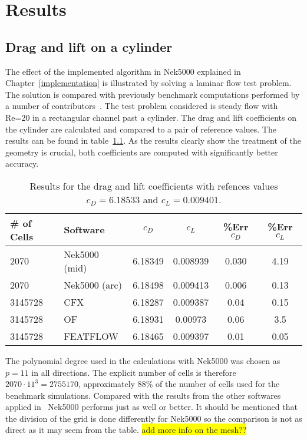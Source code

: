 
\chapter{Results} %

\label{results} %



\section{Drag and lift on a cylinder}
The effect of the implemented algorithm in Nek5000 explained in Chapter~\ref{implementation} is
illustrated by solving a laminar flow test problem. 
The solution is compared with previously benchmark computations performed by a number of 
contributors~\cite{benchmark}. The test problem considered is steady flow with Re=20 in 
a rectangular channel past a cylinder. The drag and lift coefficients on the cylinder 
are calculated and compared to a pair of reference values. The results can be found in 
table~\ref{tab:testcase}. As the results clearly show the treatment of the geometry is 
crucial, both coefficients are computed with significantly better accuracy. 
%
\begin{table}
\centering
\begin{tabular}{l l c c c c}
		\toprule
		\# of Cells & Software & $c_D$ & $c_L$ & \%\textbf{Err} $c_D$ &\%\textbf{Err} $c_L$ \\ \midrule 
		2070 & Nek5000 (mid) & 6.18349 & 0.008939 & 0.030 & 4.19 \\ 
		2070 & Nek5000 (arc) & 6.18498 & 0.009413 & 0.006 & 0.13 \\
		3145728 & CFX 		 & 6.18287 & 0.009387 & 0.04 &0.15 \\
		3145728 & OF	     & 6.18931 & 0.00973 & 0.06 &3.5 \\
		3145728 & FEATFLOW   & 6.18465 & 0.009397 & 0.01 &0.05 \\
		\bottomrule	
	\end{tabular}
	\caption{Results for the drag and lift coefficients with refences values 
	$c_D = 6.18533$ and $c_L = 0.009401$.}
\label{tab:testcase}
\end{table}
%
The polynomial degree used in the calculations with Nek5000 was chosen as $p = 11 $ 
in all directions. The explicit number of cells is therefore $2070\cdot11^{3} = 2755170$,
approximately $88\%$ of the number of cells used for the benchmark simulations. Compared 
with the results from the other softwares applied in~\cite{benchmark} Nek5000 performs 
just as well or better. It should be mentioned that the division of the grid is done 
differently for Nek5000 so the comparison is not as direct as it may seem from the table.
\colorbox{yellow}{add more info on the mesh??}

